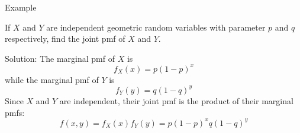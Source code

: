 \documentclass[handout]{beamer}
\renewcommand{\emph}{\textbf}
\begin{document}
\begin{frame}{Example}
\begin{block}{}
If $X$ and $Y$ are independent geometric random variables with parameter $p$ and $q$ respectively, find the joint pmf of $X$ and $Y$.
\end{block}
\pause Solution: The marginal pmf of $X$ is
$$f_X(x) = p(1-p)^x$$
\pause while the marginal pmf of $Y$ is
$$f_Y(y) = q(1-q)^y$$
\pause Since $X$ and $Y$ are independent, their joint pmf is the product of their marginal pmfs:
$$f(x,y) = f_X(x)f_Y(y) = p(1-p)^xq(1-q)^y$$
\end{frame}


%
%
%
\end{document}
